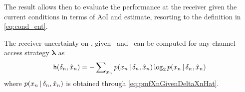 The result allows then to evaluate the performance at the receiver given the current conditions in terms of AoI and estimate, resorting to the definition in \eqref{eq:cond_ent}.
\begin{lemma}
    The receiver uncertainty on \Mcn, given \agen\ and \estn\ can be computed for any channel access strategy $\bm \lambda$ as
        \begin{align}
        \mathsf h(\delta_n,\hat{x}_n) = -\sum\nolimits_{x_n} p(x_n\, | \,\delta_n,\hat{x}_n) \log_2 p(x_n\, | \,\delta_n,\hat{x}_n)
    \end{align}
    where $p(x_n\, | \,\delta_n,\hat{x}_n)$ is obtained through \eqref{eq:pmfXnGivenDeltaXnHat}.
\end{lemma}

